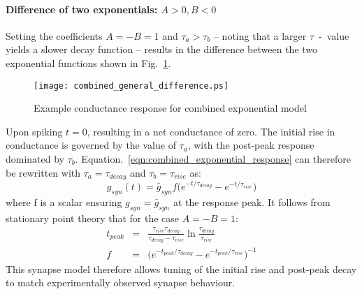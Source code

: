 \documentclass[12pt]{article}
\begin{document}
\paragraph{Difference of two exponentials: $A>0, B<0$ \newline}
\noindent Setting the coefficients $A = -B = 1$ and $\tau_a > \tau_b$ --
noting that a larger $\tau$~-~value yields a slower decay function -- results in
the difference between the two exponential functions shown in Fig.~\ref{fig:difference_exp_example}.
\begin{figure}[!h]
\begin{centering}
\texttt{[image: combined\_general\_difference.ps]}
\caption{Example conductance response for combined exponential model}
\label{fig:difference_exp_example}
\end{centering}
\end{figure}
Upon spiking $t = 0$, resulting in a net conductance of zero. The initial rise
in conductance is governed by the value of $\tau_a$, with the post-peak response
dominated by $\tau_b$. Equation.~\ref{eqn:combined_exponential_response} can
therefore be rewritten with $\tau_a = \tau_{decay}$ and $\tau_b = \tau_{rise}$
as:
\begin{equation}
g_{syn}(t)=\bar{g}_{syn}f\Big(e^{-t / \tau_{decay}} - e^{-t /
\tau_{rise}}\Big)
\label{eqn:}
\end{equation}
where f is a scalar ensuring $g_{syn} = \bar{g}_{syn}$ at the response peak. It
follows from stationary point theory that for the case $A = -B = 1$:
\begin{eqnarray}
t_{peak}&=&\frac{\tau_{rise}\tau_{decay}}{\tau_{decay}
- \tau_{rise}}\ln\frac{\tau_{decay}}{\tau_{rise}} \nonumber
\\
f&=&\Big( e^{-t_{peak} / \tau_{decay}} - e^{-t_{peak} / \tau_{rise}}\Big)^{-1}
\nonumber
\label{eqn:combined_exponential_diff_response}
\end{eqnarray}
This synapse model therefore allows tuning of the initial rise and post-peak
decay to match experimentally observed synapse behaviour.
\end{document}
